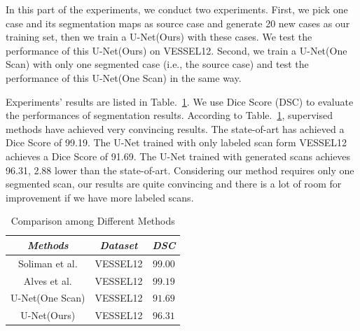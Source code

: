 \documentclass{article}
\begin{document}
In this part of the experiments, we conduct two experiments.
First, we pick one case and its segmentation maps as source case and generate 20 new cases as our training set, then we train a U-Net(Ours) with these cases. We test the performance of this U-Net(Ours) on VESSEL12.
Second, we train a U-Net(One Scan) with only one segmented case (i.e., the source case) and test the performance of this U-Net(One Scan) in the same way.

Experiments' results are listed in Table.~\ref{vesselres}. We use Dice Score (DSC) \cite{dice1945measures} to evaluate the performances of segmentation results. According to Table.~\ref{vesselres}, supervised methods have achieved very convincing results. The state-of-art has achieved a Dice Score of 99.19. The U-Net trained with only labeled scan form VESSEL12 achieves a Dice Score of 91.69. The U-Net trained with generated scans achieves 96.31, 2.88 lower than the state-of-art. Considering our method requires only one segmented scan, our results are quite convincing and there is a lot of room for improvement if we have more labeled scans.

\begin{table}[htbp]    
    \caption{Comparison among Different Methods}

    \begin{center}
    \begin{tabular}{c|c|c}

    \hline
    \textbf{\textit{Methods}} & \textbf{\textit{Dataset}}& \textbf{\textit{DSC}}\\
    \hline
    Soliman et al. \cite{soliman2016accurate} & VESSEL12 & $99.00$ \\
    Alves et al. \cite{alves2018extracting} & VESSEL12 & $99.19$ \\
    \hline
    U-Net(One Scan) & VESSEL12 & $91.69$ \\
    U-Net(Ours) & VESSEL12 & $96.31$ \\
    \hline

    \end{tabular}
    \vspace{-0cm}

    \end{center}

    \vspace{-0cm}\    
    \label{vesselres}
    \end{table}
\end{document}
